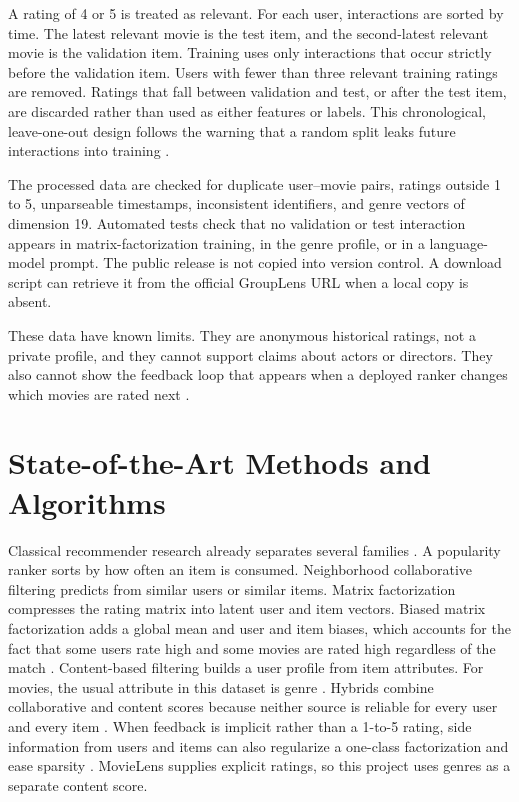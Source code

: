 \documentclass[conference]{IEEEtran}
\begin{document}
A rating of 4 or 5 is treated as relevant. For each user, interactions are sorted by time. The latest relevant movie is the test item, and the second-latest relevant movie is the validation item. Training uses only interactions that occur strictly before the validation item. Users with fewer than three relevant training ratings are removed. Ratings that fall between validation and test, or after the test item, are discarded rather than used as either features or labels. This chronological, leave-one-out design follows the warning that a random split leaks future interactions into training \cite{campos2014}.

The processed data are checked for duplicate user--movie pairs, ratings outside 1 to 5, unparseable timestamps, inconsistent identifiers, and genre vectors of dimension 19. Automated tests check that no validation or test interaction appears in matrix-factorization training, in the genre profile, or in a language-model prompt. The public release is not copied into version control. A download script can retrieve it from the official GroupLens URL when a local copy is absent.

These data have known limits. They are anonymous historical ratings, not a private profile, and they cannot support claims about actors or directors. They also cannot show the feedback loop that appears when a deployed ranker changes which movies are rated next \cite{steck2011}.

\section{State-of-the-Art Methods and Algorithms}
Classical recommender research already separates several families \cite{burke2002,herlocker2004}. A popularity ranker sorts by how often an item is consumed. Neighborhood collaborative filtering predicts from similar users or similar items. Matrix factorization compresses the rating matrix into latent user and item vectors. Biased matrix factorization adds a global mean and user and item biases, which accounts for the fact that some users rate high and some movies are rated high regardless of the match \cite{koren2008,koren2009}. Content-based filtering builds a user profile from item attributes. For movies, the usual attribute in this dataset is genre \cite{lops2011}. Hybrids combine collaborative and content scores because neither source is reliable for every user and every item \cite{burke2002}. When feedback is implicit rather than a 1-to-5 rating, side information from users and items can also regularize a one-class factorization and ease sparsity \cite{yao2014}. MovieLens supplies explicit ratings, so this project uses genres as a separate content score.
\end{document}
